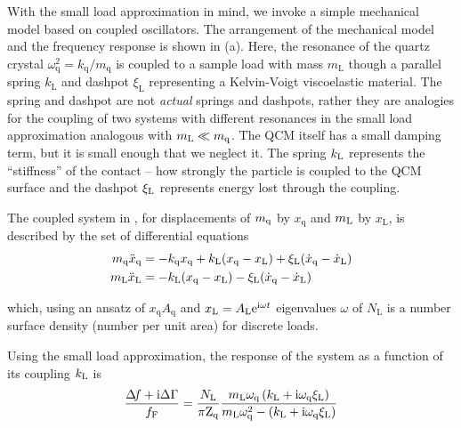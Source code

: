 With the small load approximation in mind, we invoke a simple mechanical
model based on coupled oscillators.  The arrangement of the mechanical
model and the frequency response is shown in
(a).
Here, the resonance of the quartz crystal
$\omega_\mathrm{q}^2=k_\mathrm{q}/m_\mathrm{q}$ is coupled to a sample load
with mass $m_\mathrm{L}$ though a parallel spring $k_\mathrm{L}$ and
dashpot $\xi_\mathrm{L}$ representing a Kelvin-Voigt viscoelastic material.
The spring and dashpot are not \textit{actual} springs and dashpots, rather
they are analogies for the coupling of two systems with different
resonances in the small load approximation analogous with $m_\mathrm{L}\ll m_\mathrm{q}$.  The
QCM itself has a small damping term, but it is small enough that we neglect
it.  The spring $k_\mathrm{L}$ represents the ``stiffness'' of the contact -- how
strongly the particle is coupled to the QCM surface and the dashpot $\xi_\mathrm{L}$
represents energy lost through the coupling.  

The coupled system in , for displacements of
$m_\mathrm{q}$ by $x_\mathrm{q}$ and $m_\mathrm{L}$ by $x_\mathrm{L}$, is described by the
set of differential equations
\begin{align}
 m_\mathrm{q} \ddot{x}_\mathrm{q} &= -k_\mathrm{q} x_\mathrm{q} +k_\mathrm{L} (x_\mathrm{q}-x_\mathrm{L}) + \xi_\mathrm{L} (\dot{x}_\mathrm{q}-\dot{x}_\mathrm{L})\\
 m_\mathrm{L} \ddot{x}_\mathrm{L} &= -k_\mathrm{L} (x_\mathrm{q}-x_\mathrm{L}) - \xi_\mathrm{L} (\dot{x}_\mathrm{q}-\dot{x}_\mathrm{L})
\end{align}

which, using an ansatz of
$x_\mathrm{q}A_\mathrm{q}$ and $x_\mathrm{L}=A_\mathrm{L}{\mathrm{e}}^{{\mathrm{i}} \omega t}$
eigenvalues $\omega$ of
$N_\mathrm{L}$ is a number surface density (number per unit area) for discrete
loads.

Using the small load approximation, the response of the system
as a function of its coupling $k_\mathrm{L}$ is
\begin{equation}
\frac{\Delta\!f + {\mathrm{i}} \Delta \Gamma}{f_\mathrm{F}} = \frac{N_\mathrm{L}}{\pi
\mathrm{Z}_\mathrm{q}}
\frac{m_\mathrm{L} \omega_\mathrm{q} \left( k_\mathrm{L} + {\mathrm{i}}
\omega_\mathrm{q} \xi_\mathrm{L}\right) }
{m_\mathrm{L} \omega_\mathrm{q}^2 - \left(k_\mathrm{L} + {\mathrm{i}}
\omega_\mathrm{q} \xi_\mathrm{L}\right)}
\label{eqn:mastereq}
\end{equation}

